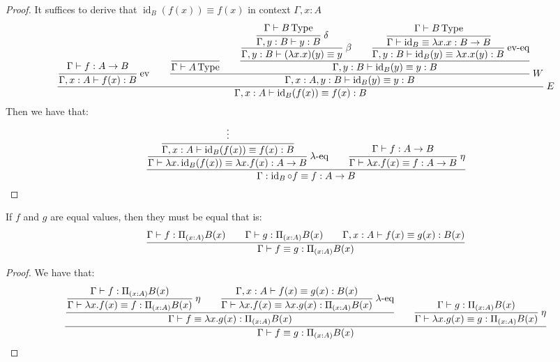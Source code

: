 \begin{proof}
    It suffices to derive that $\operatorname{id}_B(f(x))\equiv f(x)$ in context $\Gamma,x:A$ 
    \begin{equation*}
        \cfrac{\cfrac{\Gamma\vdash f:A\rightarrow B}{\Gamma, x:A\vdash f(x):B}\text{ ev}\qquad \cfrac{\cfrac{}{\Gamma\vdash A\type}\qquad \cfrac{\cfrac{\cfrac{\Gamma\vdash B\type}{\Gamma, y:B\vdash y:B}\ \delta}{\Gamma, y:B\vdash(\lambda x.x)(y)\equiv y}\ \beta\qquad\cfrac{\cfrac{\Gamma\vdash B\type }{\Gamma\vdash\operatorname{id}_B\equiv\lambda x.x:B\rightarrow B}}{\Gamma, y:B\vdash \operatorname{id}_B(y)\equiv \lambda x.x(y):B}\text{ ev-eq}}{\Gamma, y:B\vdash \operatorname{id}_B(y)\equiv y:B}}{\Gamma, x:A, y:B\vdash \operatorname{id}_B(y)\equiv y:B}\ W}{\Gamma,x:A\vdash\operatorname{id}_B(f(x))\equiv f(x):B} \ E
    \end{equation*}
    Then we have that:
    \begin{equation*}
        \cfrac{\cfrac{\cfrac{\vdots}{\Gamma,x:A\vdash\operatorname{id}_B(f(x))\equiv f(x):B}}{\Gamma\vdash\lambda x.\operatorname{id}_B(f(x))\equiv\lambda x.f(x):A\to B}\ \lambda\text{-eq}\qquad\cfrac{\Gamma\vdash f:A\to B}{\Gamma\vdash\lambda x.f(x)\equiv f:A\to B}\ \eta}{\Gamma:\operatorname{id}_B\circ f\equiv f:A\rightarrow B}
    \end{equation*}
\end{proof}


\begin{lemma}
    \label{lemma:equal-function-eval-equal}
    If $f$ and $g$ are equal values, then they must be equal that is:
    \begin{equation*}
        \cfrac{\Gamma\vdash f:\Pi_{(x:A)}B(x)\qquad \Gamma\vdash g:\Pi_{(x:A)}B(x)\qquad \Gamma, x:A\vdash f(x)\equiv g(x):B(x)}{\Gamma\vdash f\equiv g:\Pi_{(x:A)}B(x)}
    \end{equation*}
\end{lemma}

\begin{proof}
    We have that:
    \begin{equation*}
        \cfrac{\cfrac{\cfrac{\Gamma\vdash f:\Pi_{(x:A)}B(x)}{\Gamma\vdash \lambda x.f(x)\equiv f:\Pi_{(x:A)}B(x)}\ \eta\qquad\cfrac{\Gamma, x:A\vdash f(x)\equiv g(x):B(x)}{\Gamma\vdash \lambda x.f(x)\equiv \lambda x.g(x):\Pi_{(x:A)}B(x)}\ \lambda\text{-eq}}{\Gamma\vdash f\equiv\lambda x.g(x):\Pi_{(x:A)}B(x)}\qquad\cfrac{\Gamma\vdash g:\Pi_{(x:A)}B(x)}{\Gamma\vdash \lambda x.g(x)\equiv g:\Pi_{(x:A)}B(x)}\ \eta}{\Gamma\vdash f\equiv g:\Pi_{(x:A)}B(x)}
    \end{equation*}
\end{proof}


